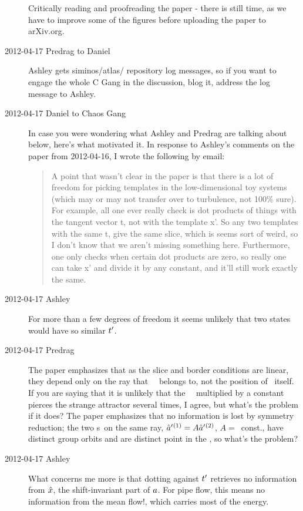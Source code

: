 \begin{description}
Critically reading and proofreading the paper - there is still time, as
we have to improve some of the figures before uploading the paper to
arXiv.org.

\item[2012-04-17 Predrag to Daniel] Ashley gets siminos/atlas/ repository
log messages, so if you want to engage the whole C Gang in the
discussion, blog it, address the log message to Ashley.

\item[2012-04-17 Daniel to Chaos Gang] In case you were wondering what
Ashley and Predrag are talking about below, here's what motivated it. In
response to Ashley's comments on the paper from 2012-04-16, I wrote the
following by email:

\begin{quotation}
A point that wasn't clear in the paper is that there is
a lot of freedom for picking templates in the low-dimensional toy systems
(which may or may not transfer over to turbulence, not 100\% sure). For
example, all one ever really check is dot products of things with the
tangent vector t, not with the template x'. So any two templates with the
same t, give the same slice, which is seems sort of weird, so I don't
know that we aren't missing something here. Furthermore, one only checks
when certain dot products are zero, so really one can take x' and divide
it by any constant, and it'll still work exactly the same.
\end{quotation}

\item[2012-04-17 Ashley]
For more than a few degrees of freedom it seems unlikely that two states
would have so similar $t'_{}$.

\item[2012-04-17 Predrag]
The paper emphasizes that as the slice and border conditions
are linear, they depend only on the ray that \template\ \slicep\ belongs
to, not the position of \slicep\ itself. If you are saying that it is
unlikely that the \template\ \slicep\ multiplied by a constant pierces
the strange attractor several times, I agree, but what's the problem if it
does? The paper emphasizes that no information is lost by
symmetry reduction; the two \template s\ on the same ray,
$\hat{a}'{}^{(1)} = A \hat{a}'{}^{(2)}  $, $A=$~const., have distinct group
orbits and are distinct point in the \slice, so what's the problem?

\item[2012-04-17 Ashley]
What concerns me more is that
dotting against $t'_{}$ retrieves no information from $\hat{x}$,
the shift-invariant part of $a$.  For pipe flow, this means no
information from the mean flow!, which carries most of the energy.


\end{description}
